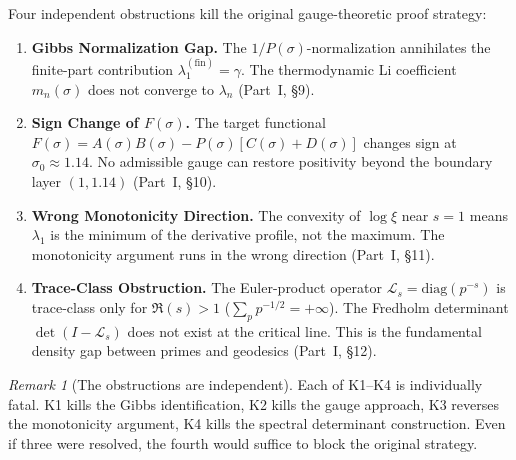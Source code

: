 \documentclass[12pt,a4paper]{article}
\theoremstyle{definition}
\theoremstyle{remark}
\newtheorem{remark}[theorem]{Remark}
\begin{document}
Four independent obstructions kill the original gauge-theoretic proof strategy:

\begin{enumerate}[label=\textbf{K\arabic*},leftmargin=3em]
  \item \textbf{Gibbs Normalization Gap.} The $1/P(\sigma)$-normalization annihilates the finite-part contribution $\lambda_1^{(\mathrm{fin})} = \gamma$. The thermodynamic Li coefficient $m_n(\sigma)$ does not converge to $\lambda_n$ (Part~I, \S9).

  \item \textbf{Sign Change of $F(\sigma)$.} The target functional $F(\sigma) = A(\sigma)B(\sigma) - P(\sigma)[C(\sigma) + D(\sigma)]$ changes sign at $\sigma_0 \approx 1.14$. No admissible gauge can restore positivity beyond the boundary layer $(1, 1.14)$ (Part~I, \S10).

  \item \textbf{Wrong Monotonicity Direction.} The convexity of $\log\xi$ near $s = 1$ means $\lambda_1$ is the minimum of the derivative profile, not the maximum. The monotonicity argument runs in the wrong direction (Part~I, \S11).

  \item \textbf{Trace-Class Obstruction.} The Euler-product operator $\mathcal{L}_s = \mathrm{diag}(p^{-s})$ is trace-class only for $\Re(s) > 1$ ($\sum_p p^{-1/2} = +\infty$). The Fredholm determinant $\det(I - \mathcal{L}_s)$ does not exist at the critical line. This is the fundamental density gap between primes and geodesics (Part~I, \S12).
\end{enumerate}

\begin{remark}[The obstructions are independent]
Each of K1--K4 is individually fatal. K1 kills the Gibbs identification, K2 kills the gauge approach, K3 reverses the monotonicity argument, K4 kills the spectral determinant construction. Even if three were resolved, the fourth would suffice to block the original strategy.
\end{remark}
\end{document}
